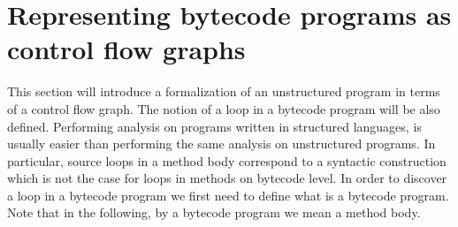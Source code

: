 \newtheorem{defEdge}{Definition}[section]
\newtheorem{defLoop}[defEdge]{Definition}
\newtheorem{defInter}[defEdge]{Definition}

\newtheorem{defInv}[defEdge]{Definition}
\newtheorem{defModif}[defEdge]{Definition}

\newtheorem{propPath}{Lemma}[section]

\section{Representing bytecode programs as control flow graphs}\label{prelim}

This section will introduce a formalization of an unstructured program in terms of a control flow graph.
The notion of a loop in a bytecode program will be also defined.
Performing analysis on programs written in  structured languages, is usually easier than performing the same analysis 
on unstructured programs. In particular, source loops in a method body correspond to a syntactic construction which is not the 
case for loops in methods on bytecode level. In order to discover a loop in a bytecode program we first need to define 
what is a bytecode program. Note that in the following, by a  bytecode program we mean a method body.

